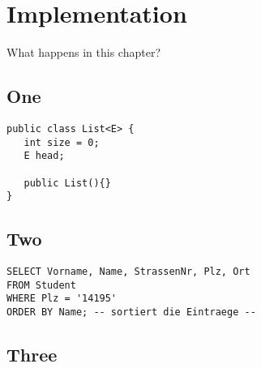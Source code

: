 \chapter{Implementation}

What happens in this chapter?

\section{One}

\begin{lstlisting}[style=java, caption={JAVA example}]
public class List<E> {
   int size = 0;
   E head;
   
   public List(){}
}
\end{lstlisting}

\section{Two}

\begin{lstlisting}[style=sql, caption={SQL example}]
SELECT Vorname, Name, StrassenNr, Plz, Ort
FROM Student
WHERE Plz = '14195'
ORDER BY Name; -- sortiert die Eintraege --
\end{lstlisting}

\section{Three}